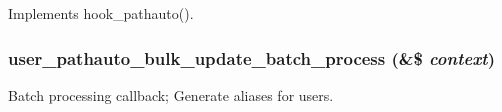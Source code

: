 \label{pathauto_8pathauto_8inc_a08bb0b4fe74c74a05ee0e56e7e9b8636}
Implements hook\_\-pathauto(). \hypertarget{pathauto_8pathauto_8inc_a7d144c0223b223f5c2ade27c7e5677ed}{
\subsubsection[{user\_\-pathauto\_\-bulk\_\-update\_\-batch\_\-process}]{\setlength{\rightskip}{0pt plus 5cm}user\_\-pathauto\_\-bulk\_\-update\_\-batch\_\-process (\&\$ {\em context})}}
\label{pathauto_8pathauto_8inc_a7d144c0223b223f5c2ade27c7e5677ed}
Batch processing callback; Generate aliases for users. 